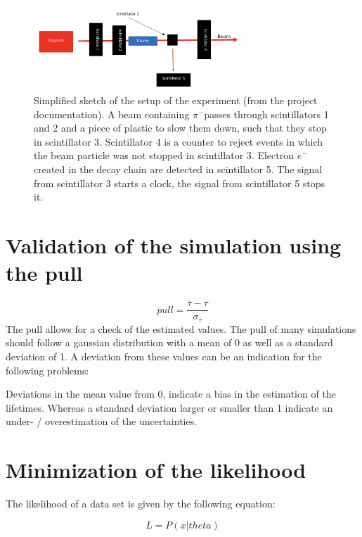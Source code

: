 \documentclass[11pt, a4paper, oneside]{book}
\newcommand{\electron}{$e^{-}$}
\newcommand{\pion}{$\pi^{-}$}
\begin{document}
\begin{figure}[h]
\begin{center}
\includegraphics[width=0.7\textwidth]{images/experimental_setup.png}
\end{center}
\caption{Simplified sketch of the setup of the experiment (from the project documentation). A beam containing \pion passes through scintillators 1 and 2 and a piece of plastic to slow them down, such that they stop in scintillator 3. Scintillator 4 is a counter to reject events in which the beam particle was not stopped in scintillator 3. Electron \electron created in the decay chain are detected in scintillator 5. The signal from scintillator 3 starts a clock, the signal from scintillator 5 stops it.}
\label{fig:experimental_setup}
\end{figure}

\section{Validation of the simulation using the pull}
\begin{equation}
    \si{pull} = \frac{\bar{\tau} - \tau}{\sigma_{\bar{\tau}}}
    \label{eq:pull}
\end{equation}
The pull allows for a check of the estimated values. The pull of many simulations should follow a gaussian distribution with a mean of 0 as well as a standard deviation of 1. A deviation from these values can be an indication for the following problems:

Deviations in the mean value from 0, indicate a bias in the estimation of the lifetimes. Whereas a standard deviation larger or smaller than 1 indicate an under- / overestimation of the uncertainties. 

\section{Minimization of the likelihood}
The likelihood of a data set is given by the following equation:

\begin{equation}
    L = P(x | theta)
    \label{eq:likelihood_base}
\end{equation}
\end{document}
